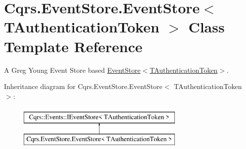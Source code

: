 \hypertarget{classCqrs_1_1EventStore_1_1EventStore}{}\section{Cqrs.\+Event\+Store.\+Event\+Store$<$ T\+Authentication\+Token $>$ Class Template Reference}
\label{classCqrs_1_1EventStore_1_1EventStore}


A Greg Young Event Store based \hyperlink{classCqrs_1_1EventStore_1_1EventStore_ab48ad2c9d72780ae3a662e213498f194_ab48ad2c9d72780ae3a662e213498f194}{Event\+Store$<$\+T\+Authentication\+Token$>$}.  


Inheritance diagram for Cqrs.\+Event\+Store.\+Event\+Store$<$ T\+Authentication\+Token $>$\+:\begin{figure}[H]
\begin{center}
\leavevmode
\includegraphics[height=2.000000cm]{classCqrs_1_1EventStore_1_1EventStore}
\end{center}
\end{figure}
